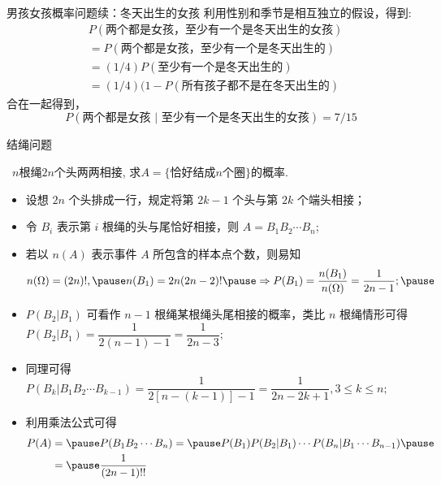 \documentclass[Prob-All.tex]{subfiles}
\begin{document}
		\begin{frame}{男孩女孩概率问题续：冬天出生的女孩}
			利用性别和季节是相互独立的假设，得到:
        \begin{align*}
            &P (\mbox{两个都是女孩，至少有一个是冬天出生的女孩})\\
            &=P (\mbox{两个都是女孩，至少有一个是冬天出生的})\\
            &=(1/4) P (\mbox{至少有一个是冬天出生的})\\
            &=(1/4) (1-P (\mbox{所有孩子都不是在冬天出生的})
        \end{align*}
        合在一起得到，$$P (\mbox{两个都是女孩 | 至少有一个是冬天出生的女孩})=7/15$$
\end{frame}


\begin{frame}{结绳问题}
	\vspace{-0cm}
	\begin{exam}\
		$n$根绳$2n$个头两两相接, 求$A=\{\mbox{恰好结成} n\mbox{个圈}\}$的概率.
	\end{exam}
	\pause
	\begin{itemize}[<+-|alert@+>]
		\item 设想 $2n$ 个头排成一行，规定将第 $2k-1$ 个头与第 $2k$ 个端头相接；
		\item 令 $B_i$ 表示第 $i$ 根绳的头与尾恰好相接，则 $A=B_1B_2\cdots B_n$;
		\item 若以 $n (A)$ 表示事件 $A$ 所包含的样本点个数，则易知 \pause
		{\small \begin{eqnarray*}
			n(\Omega)=(2n)!, \pause n(B_1)=2n(2n-2)!\pause \Rightarrow P(B_1)=\dfrac{n(B_1)}{n(\Omega)}=\dfrac{1}{2n-1};\pause
		\end{eqnarray*}}
		\item $P (B_2|B_1)$ 可看作 $n-1$ 根绳某根绳头尾相接的概率，类比 $n$ 根绳情形可得 $P (B_2|B_1)=\dfrac{1}{2 (n-1)-1}=\dfrac{1}{2n-3};$
		\item 同理可得 {\small $P (B_k|B_1B_2\cdots B_{k-1})=\dfrac{1}{2[n-(k-1)]-1}=\dfrac{1}{2n-2k+1}, 3\leq k\leq n;$}
		\item 利用乘法公式可得
		{\small\begin{align*}
			P(A)&=\pause P(B_1B_2\cdots B_n)=\pause P(B_1)P(B_2|B_1)\cdots P(B_n|B_1\cdots B_{n-1})\pause\\
			&=\pause\dfrac{1}{(2n-1)!!}
		\end{align*}}
	\end{itemize}


\end{frame}
\end{document}
